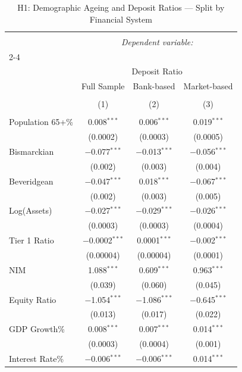 
\begin{table}[!htbp] \centering 
  \caption{H1: Demographic Ageing and Deposit Ratios --- Split by Financial System} 
  \label{} 
\begin{tabular}{@{\extracolsep{5pt}}lccc} 
\\[-1.8ex]\hline 
\hline \\[-1.8ex] 
 & \multicolumn{3}{c}{\textit{Dependent variable:}} \\ 
\cline{2-4} 
\\[-1.8ex] & \multicolumn{3}{c}{Deposit Ratio} \\ 
 & Full Sample & Bank-based & Market-based \\ 
\\[-1.8ex] & (1) & (2) & (3)\\ 
\hline \\[-1.8ex] 
 Population 65+\% & 0.008$^{***}$ & 0.006$^{***}$ & 0.019$^{***}$ \\ 
  & (0.0002) & (0.0003) & (0.0005) \\ 
  Bismarckian & $-$0.077$^{***}$ & $-$0.013$^{***}$ & $-$0.056$^{***}$ \\ 
  & (0.002) & (0.003) & (0.004) \\ 
  Beveridgean & $-$0.047$^{***}$ & 0.018$^{***}$ & $-$0.067$^{***}$ \\ 
  & (0.002) & (0.003) & (0.005) \\ 
  Log(Assets) & $-$0.027$^{***}$ & $-$0.029$^{***}$ & $-$0.026$^{***}$ \\ 
  & (0.0003) & (0.0003) & (0.0004) \\ 
  Tier 1 Ratio & $-$0.0002$^{***}$ & 0.0001$^{***}$ & $-$0.002$^{***}$ \\ 
  & (0.00004) & (0.00004) & (0.0001) \\ 
  NIM & 1.088$^{***}$ & 0.609$^{***}$ & 0.963$^{***}$ \\ 
  & (0.039) & (0.060) & (0.045) \\ 
  Equity Ratio & $-$1.054$^{***}$ & $-$1.086$^{***}$ & $-$0.645$^{***}$ \\ 
  & (0.013) & (0.017) & (0.022) \\ 
  GDP Growth\% & 0.008$^{***}$ & 0.007$^{***}$ & 0.014$^{***}$ \\ 
  & (0.0003) & (0.0004) & (0.001) \\ 
  Interest Rate\% & $-$0.006$^{***}$ & $-$0.006$^{***}$ & 0.014$^{***}$ \\ 

\end{tabular}
\end{table}

